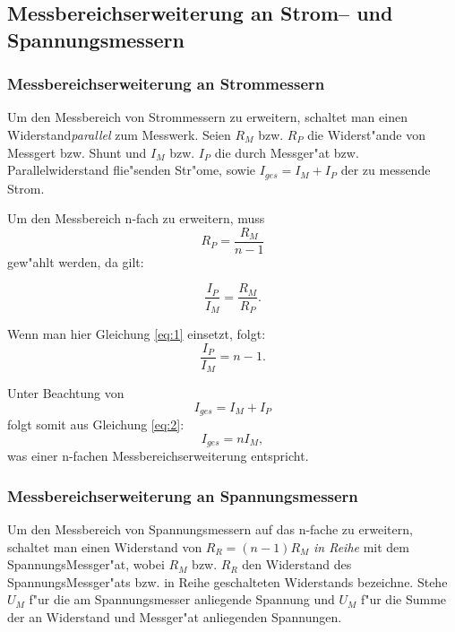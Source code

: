 \documentclass[10pt]{scrartcl}
\begin{document}
\subsection{Messbereichserweiterung an Strom-- und Spannungsmessern}

\subsubsection{Messbereichserweiterung an Strommessern}

Um den Messbereich von Strommessern zu erweitern, schaltet man einen Widerstand\emph{parallel} zum Messwerk. Seien $R_M$ bzw. $R_P$ die Widerst"ande von Messgert bzw. Shunt und $I_M$ bzw. $I_P$ die durch Messger"at bzw. Parallelwiderstand flie"senden Str"ome, sowie $I_{ges}=I_M+I_P$ der zu messende Strom.

Um den Messbereich n-fach zu erweitern, muss 
\begin{equation}
R_P=\frac{R_M}{n-1}
\label{eq:1}
\end{equation}
gew"ahlt werden, da gilt:

\begin{displaymath}
\frac{I_P}{I_M}=\frac{R_M}{R_P}.
\end{displaymath}

Wenn man hier Gleichung \eqref{eq:1} einsetzt, folgt:
\begin{equation}
\frac{I_P}{I_M}=n-1.
\label{eq:2}
\end{equation}

Unter Beachtung von
\begin{displaymath}
I_{ges}=I_M+I_P
\end{displaymath}
folgt somit aus Gleichung \eqref{eq:2}:
\begin{displaymath}
I_{ges}=n I_M,
\end{displaymath}
was einer n-fachen Messbereichserweiterung entspricht.

\subsubsection{Messbereichserweiterung an Spannungsmessern}

Um den Messbereich von Spannungsmessern auf das n-fache zu erweitern, schaltet man einen Widerstand von $R_R=(n-1) R_M$ \emph{in Reihe} mit dem SpannungsMessger"at, wobei $R_M$ bzw. $R_R$ den Widerstand des SpannungsMessger"ats  bzw. in Reihe geschalteten Widerstands bezeichne. Stehe $U_M$ f"ur die am Spannungsmesser anliegende Spannung und $U_M$ f"ur die Summe der an Widerstand und Messger"at anliegenden Spannungen.
\end{document}
